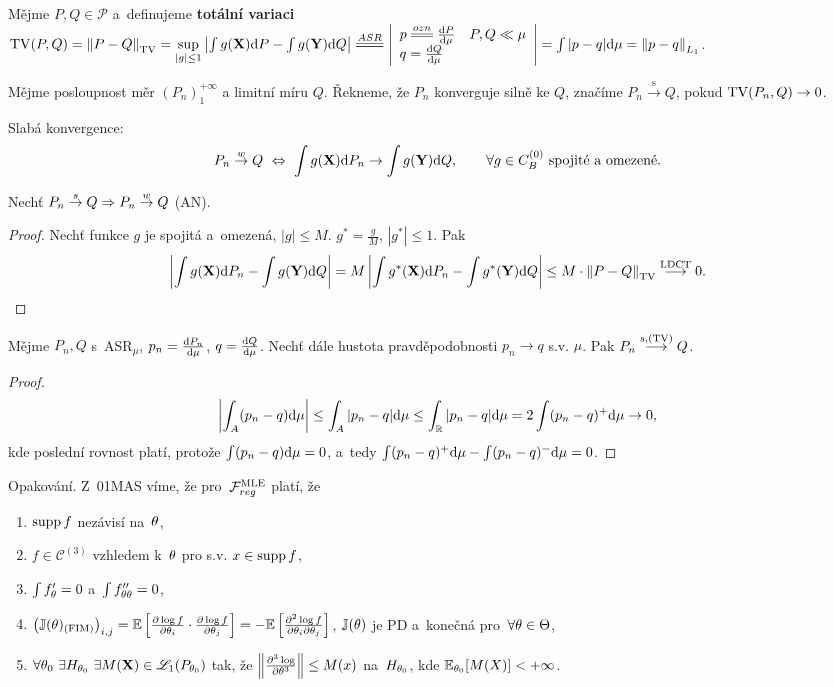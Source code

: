 \begin{define}
	Mějme $P,Q\in\mathcal{P}$ a~definujeme \textbf{totální variaci} $\TV(P,Q)=\left\|P-Q\right\|_\TV=\sup\limits_{|g|\leq 1}\left| \int g(\X)\d P-\int g(\Y)\d Q \right|\equal{ASR}\left|\begin{array}{l}
	p\equal{ozn}\frac{\d P}{\d \mu}\quad P,Q\ll\mu\\ q=\frac{\d Q}{\d \mu}
	\end{array}
	\right|=\int |p-q|\d\mu=\left\|p-q\right\|_{L_1}$.
\end{define}
\begin{define}
	Mějme posloupnost měr $(P_n)_1^{+\infty}$ a limitní míru $Q$. Řekneme, že $P_n$ konverguje silně ke $Q$, značíme $P_n\stackrel{\text{s}}{\rightarrow}Q$, pokud $\mathrm{TV}(P_n,Q)\to0$.
\end{define}
\begin{remark}{Slabá konvergence:}
	$$ P_n\stackrel{w}{\to} Q~\Leftrightarrow~\int g(\textbf{X})\mathrm{d} P_n\to\int g(\textbf{Y})\mathrm{d} Q,\qquad \forall g\in C_B^{(0)}\text{ spojité a~omezené.}$$
\end{remark}
\begin{theorem}
	Nechť $P_n\stackrel{s}{\to}Q\Rightarrow P_n\stackrel{w}{\to} Q$ (AN).
\end{theorem}
\begin{proof}
	 Nechť funkce $g$ je spojitá a~omezená, $|g|\leq M$. $g^\ast =\frac{g}{M}$, $|g^\ast|\leq 1$. Pak
	$$ \left| \int g(\textbf{X})\mathrm{d} P_n-\int g(\textbf{Y})\mathrm{d} Q \right|=M\left| \int g^\ast(\textbf{X})\mathrm{d} P_n-\int g^\ast(\textbf{Y})\mathrm{d} Q \right|\leq M\cdot \left\| P-Q\right\|_{\mathrm{TV}} \stackrel{\text{LDCT}}{\longrightarrow} 0.$$
\end{proof}
\begin{theorem}
	Mějme $P_n,Q$ s~ASR$_\mu$, $p_n=\frac{\mathrm{d} P_n}{\mathrm{d} \mu}$, $q=\frac{\mathrm{d} Q}{\mathrm{d} \mu}$. Nechť dále hustota pravděpodobnosti $p_n\to q$ s.v. $\mu$. Pak $P_n\stackrel{s,(\mathrm{TV})}{\longrightarrow}Q$. 
	\begin{proof}
		$$ \left| \int_A (p_n-q)\mathrm{d}\mu \right|\leq \int_A|p_n-q|\mathrm{d}\mu\leq \int_{\mathbb{R}}|p_n-q|\mathrm{d}\mu=2\int(p_n-q)^+\mathrm{d}\mu\to0,$$
		kde poslední rovnost platí, protože $\int(p_n-q)\mathrm{d}\mu=0$, a~tedy $\int(p_n-q)^+\mathrm{d}\mu-\int(p_n-q)^-\mathrm{d}\mu=0$.	\end{proof}
\end{theorem}
\begin{remark}
	Opakování. Z~01MAS víme, že pro~$\mathcal{F}_{reg}^{\mathrm{{\footnotesize MLE }}}$ platí, že \begin{enumerate}[1)]
		\item $\mathop{\mathrm{supp}} f$ nezávisí na~$\theta$,
		\item $f\in\mathcal{C}^{(3)}$ vzhledem k~$\theta$ pro s.v. $x\in\mathop{\mathrm{supp}} f$,
		\item $\int f_\theta'=0$ a~$\int f_{\theta\theta}''=0$,
		\item $\left( \mathbb{J}(\theta)_{(\text{FIM})} \right)_{i,j}=\mathbb{E}\left[ \frac{\partial\log f}{\partial \theta_i}\cdot\frac{\partial\log f}{\partial \theta_j} \right]=-\mathbb{E}\left[ \frac{\partial^2 \log f}{\partial\theta_i \partial \theta_j} \right]$, $\mathbb{J}(\theta)$ je PD a~konečná pro~$\forall\theta\in\Theta$,
		\item $\forall\theta_0~\exists H_{\theta_0}~\exists M(\textbf{X})\in\mathscr{L}_1(P_{\theta_0})$ tak, že $\left\| \frac{\partial^3\log }{\partial \theta^3}\right\|\leq M(x)$ na~$H_{\theta_0}$, kde $\mathbb{E}_{\theta_0}[M(X)]<+\infty$.
	\end{enumerate}
\end{remark}
